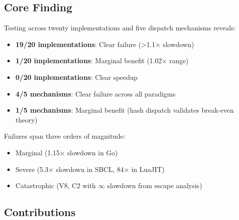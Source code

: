\documentclass[sigplan,final]{acmart}
\begin{document}
\subsection{Core Finding}

Testing across twenty implementations and five dispatch mechanisms reveals:
\begin{itemize}
  \item \textbf{19/20 implementations}: Clear failure (>1.1× slowdown)
  \item \textbf{1/20 implementations}: Marginal benefit (1.02× range)
  \item \textbf{0/20 implementations}: Clear speedup
  \item \textbf{4/5 mechanisms}: Clear failure across all paradigms
  \item \textbf{1/5 mechanisms}: Marginal benefit (hash dispatch validates break-even theory)
\end{itemize}

Failures span three orders of magnitude:
\begin{itemize}
  \item Marginal (1.15× slowdown in Go)
  \item Severe (5.3× slowdown in SBCL, 84× in LuaJIT)
  \item Catastrophic (V8, C2 with $\infty$ slowdown from escape analysis)
\end{itemize}

\subsection{Contributions}
\end{document}
